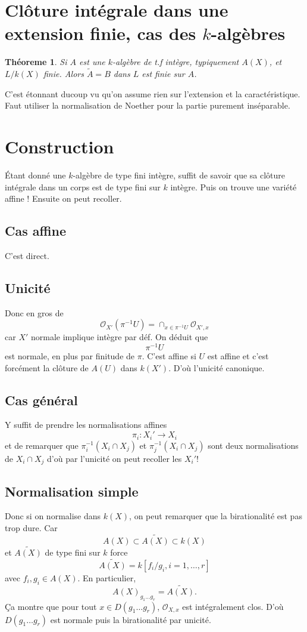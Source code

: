\documentclass[a4paper,12pt]{book}
\newcommand{\Or}{\mathcal{O}}
\theoremstyle{plain}
\newtheorem{thm}[subsection]{Théoreme}
\theoremstyle{definition}
\theoremstyle{remark}
\begin{document}
\section{Clôture intégrale dans une extension finie, cas des
$k$-algèbres}
\begin{thm}
    Si $A$ est une $k$-algèbre de t.f intègre, typiquement $A(X)$,
    et $L/k(X)$ finie. Alors $\tilde A=B$ dans $L$ est finie sur
    $A$.
\end{thm}
C'est étonnant ducoup vu qu'on assume rien sur l'extension et 
la caractéristique. Faut utiliser la normalisation de Noether
pour la partie purement inséparable.

\section{Construction}
Étant donné une $k$-algèbre de type fini intègre, suffit de
savoir que sa clôture intégrale dans un corps est de type 
fini sur $k$ intègre. Puis on trouve une variété affine ! Ensuite
on peut recoller.
\subsection*{Cas affine}
C'est direct.

\subsection*{Unicité}
Donc en gros de
\[\Or_{X'}(\pi^{-1}U)=\cap_{x\in \pi^{-1}U}\Or_{X',x}\]
car $X'$ normale implique intègre par déf. On déduit que 
\[\pi^{-1}U\]
est normale, en plus par finitude de $\pi$. C'est affine si $U$
est affine et c'est forcément la clôture de $A(U)$ dans $k(X')$.
D'où l'unicité canonique. 
\subsection*{Cas général}
Y suffit de prendre les normalisations affines
\[\pi_i\colon X_i'\to X_i\]
et de remarquer que $\pi_i^{-1}(X_i\cap X_j)$ et 
$\pi_j^{-1}(X_i\cap X_j)$ sont deux normalisations de $X_i\cap X_j$
d'où par l'unicité on peut recoller les $X_i'$!

\subsection*{Normalisation simple}
Donc si on normalise dans $k(X)$, on peut remarquer que la 
birationalité est pas trop dure. Car 
\[A(X)\subset\tilde{A(X)}\subset k(X)\]
et $\tilde{A(X)}$ de type fini sur $k$ force 
\[\tilde{A(X)}=k[f_i/g_i,i=1,\ldots, r]\] avec $f_i,g_i\in A(X)$.
En particulier, \[A(X)_{g_1\ldots g_r}=\tilde{A(X)}.\] Ça montre
que pour tout $x\in D(g_1\ldots g_r)$, $\Or_{X,x}$ est 
intégralement clos. D'où $D(g_1\ldots g_r)$ est normale puis
la birationalité par unicité.




\printbibliography
\end{document}
